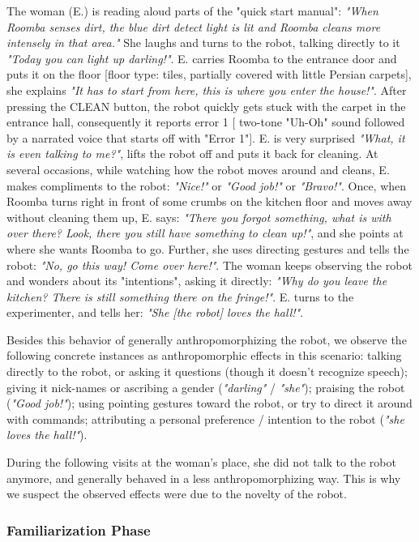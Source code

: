 \documentclass{frontiersSCNS} %
\begin{document}
The woman (E.) is reading aloud parts of the "quick start manual": \emph{"When
Roomba senses dirt, the blue dirt detect light is lit and Roomba cleans more
intensely in that area."} She laughs and turns to the robot, talking directly to
it \emph{"Today you can light up darling!"}. E. carries Roomba to the entrance
door and puts it on the floor [floor type: tiles, partially covered with little
Persian carpets], she explains \emph{"It has to start from here, this is where
you enter the house!"}. After pressing the CLEAN button, the robot quickly gets
stuck with the carpet in the entrance hall, consequently it reports error 1 [
two-tone "Uh-Oh" sound followed by a narrated voice that starts off with "Error
1"]. E. is very surprised \emph{"What, it is even talking to me?"}, lifts the
robot off and puts it back for cleaning. At several occasions, while watching
how the robot moves around and cleans, E. makes compliments to the robot:
\emph{"Nice!"} or \emph{"Good job!"} or \emph{"Bravo!"}. Once, when Roomba turns
right in front of some crumbs on the kitchen floor and moves away without
cleaning them up, E. says: \emph{"There you forgot something, what is with over
there? Look, there you still have something to clean up!"}, and she points at
where she wants Roomba to go. Further, she uses directing gestures and tells the
robot: \emph{"No, go this way! Come over here!"}. The woman keeps observing the
robot and wonders about its "intentions", asking it directly: \emph{"Why do you
leave the kitchen? There is still something there on the fringe!"}. E. turns to
the experimenter, and tells her: \emph{"She [the robot] loves the hall!"}.

Besides this behavior of generally anthropomorphizing the robot, we observe the
following concrete instances as anthropomorphic effects in this scenario:
talking directly to the robot, or asking it questions (though it doesn't
recognize speech); giving it nick-names or ascribing a gender (\emph{"darling"}
/ \emph{"she"}); praising the robot (\emph{"Good job!"}); using pointing
gestures toward the robot, or try to direct it around with commands; attributing
a personal preference / intention to the robot (\emph{"she loves the hall!"}).

During the following visits at the woman's place, she did not talk to the robot
anymore, and generally behaved in a less anthropomorphizing way. This is why we
suspect the observed effects were due to the novelty of the robot.

\subsubsection{Familiarization Phase}
\label{sec:familiarization}
\end{document}
